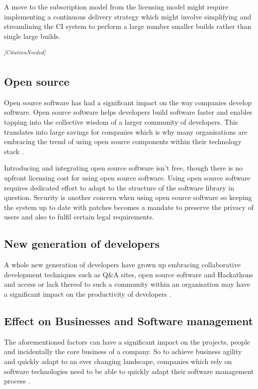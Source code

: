 \documentclass[10pt,conference]{IEEEtran}
\newcommand{\citationneeded}{\textsuperscript{\textit{[CitationNeeded]}}}
\begin{document}
A move to the subscription model from the licensing model might require implementing a continuous delivery strategy which might involve simplifying and streamlining the CI system to perform a large number smaller builds rather than single large builds.

\citationneeded

\subsection*{Open source}

Open source software has had a significant impact on the way companies develop software. Open source software helps developers build software faster and enables tapping into the collective wisdom of a larger community of developers. This translates into large savings for companies which is why many organisations are embracing the trend of using open source components within their technology stack \cite{baldwin_4_2014} \cite{lemmens_open_2008}.

Introducing and integrating open source software isn't free, though there is no upfront licensing cost for using open source software. Using open source software requires dedicated effort to adapt to the structure of the software library in question. Security is another concern when using open source software so keeping the system up to date with patches becomes a mandate to preserve the privacy of users and also to fulfil certain legal requirements.

\subsection*{New generation of developers}

A whole new generation of developers have grown up embracing collaborative development techniques such as Q\&A sites, open source software and Hackathons and access or lack thereof to such a community within an organisation may have a significant impact on the productivity of developers \cite{vasilescu_continuous_2014}. 


\subsection*{Effect on Businesses and Software management}

The aforementioned factors can have a significant impact on the projects, people and incidentally the core business of a company. So to achieve business agility and quickly adapt to an ever changing landscape, companies which rely on software technologies need to be able to quickly adapt their software management process \cite{mathiassen_business_2006}.
\end{document}
